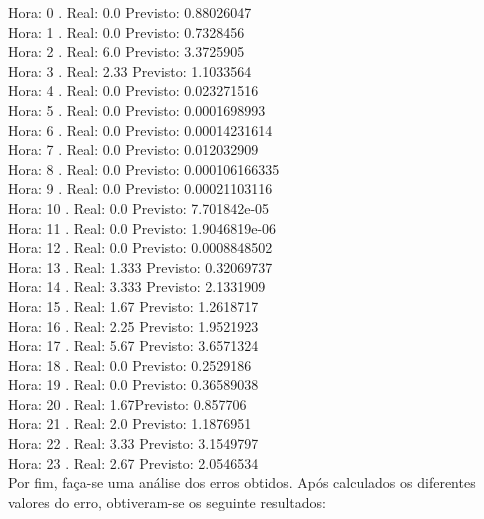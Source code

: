 \documentclass[a4paper, 12pt]{article}
\begin{document}
Hora:  0 . Real:  0.0 Previsto:  0.88026047
\\
Hora:  1 . Real:  0.0 Previsto:  0.7328456
\\
Hora:  2 . Real:  6.0 Previsto:  3.3725905
\\
Hora:  3 . Real:  2.33 Previsto:  1.1033564
\\
Hora:  4 . Real:  0.0 Previsto:  0.023271516
\\
Hora:  5 . Real:  0.0 Previsto:  0.0001698993
\\
Hora:  6 . Real:  0.0 Previsto:  0.00014231614
\\
Hora:  7 . Real:  0.0 Previsto:  0.012032909
\\
Hora:  8 . Real:  0.0 Previsto:  0.000106166335
\\
Hora:  9 . Real:  0.0 Previsto:  0.00021103116
\\
Hora:  10 . Real:  0.0 Previsto:  7.701842e-05
\\
Hora:  11 . Real:  0.0 Previsto:  1.9046819e-06
\\
Hora:  12 . Real:  0.0 Previsto:  0.0008848502
\\
Hora:  13 . Real:  1.333 Previsto:  0.32069737
\\
Hora:  14 . Real:  3.333 Previsto:  2.1331909
\\
Hora:  15 . Real:  1.67 Previsto:  1.2618717
\\
Hora:  16 . Real:  2.25 Previsto:  1.9521923
\\
Hora:  17 . Real:  5.67 Previsto:  3.6571324
\\
Hora:  18 . Real:  0.0 Previsto:  0.2529186
\\
Hora:  19 . Real:  0.0 Previsto:  0.36589038
\\
Hora:  20 . Real:  1.67Previsto:  0.857706
\\
Hora:  21 . Real:  2.0 Previsto:  1.1876951
\\
Hora:  22 . Real:  3.33 Previsto:  3.1549797
\\
Hora:  23 . Real:  2.67 Previsto:  2.0546534
\\

Por fim, faça-se uma análise dos erros obtidos. Após calculados os diferentes valores do erro, obtiveram-se os seguinte resultados:
\end{document}
